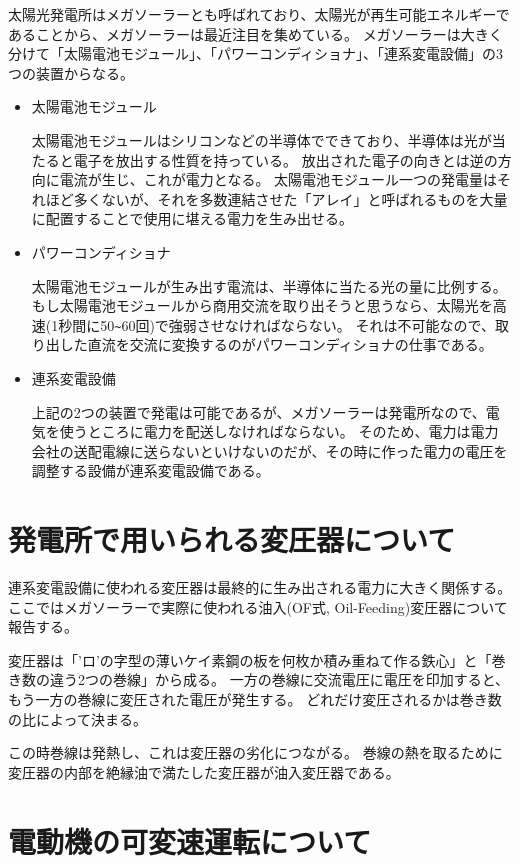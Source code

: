 \documentclass[12pt,titlepage]{ltjsarticle}
\begin{document}
太陽光発電所はメガソーラーとも呼ばれており、太陽光が再生可能エネルギーであることから、メガソーラーは最近注目を集めている。
メガソーラーは大きく分けて「太陽電池モジュール」、「パワーコンディショナ」、「連系変電設備」の3つの装置からなる。
\begin{itemize}
\item 太陽電池モジュール

太陽電池モジュールはシリコンなどの半導体でできており、半導体は光が当たると電子を放出する性質を持っている。
放出された電子の向きとは逆の方向に電流が生じ、これが電力となる。
太陽電池モジュール一つの発電量はそれほど多くないが、それを多数連結させた「アレイ」と呼ばれるものを大量に配置することで使用に堪える電力を生み出せる。

\item パワーコンディショナ

太陽電池モジュールが生み出す電流は、半導体に当たる光の量に比例する。
もし太陽電池モジュールから商用交流を取り出そうと思うなら、太陽光を高速(1秒間に50\verb|~|60回)で強弱させなければならない。
それは不可能なので、取り出した直流を交流に変換するのがパワーコンディショナの仕事である。

\item 連系変電設備

上記の2つの装置で発電は可能であるが、メガソーラーは発電所なので、電気を使うところに電力を配送しなければならない。
そのため、電力は電力会社の送配電線に送らないといけないのだが、その時に作った電力の電圧を調整する設備が連系変電設備である。
\end{itemize}

\section{発電所で用いられる変圧器について}

連系変電設備に使われる変圧器は最終的に生み出される電力に大きく関係する。
ここではメガソーラーで実際に使われる油入(OF式, Oil-Feeding)変圧器について報告する。

変圧器は「'ロ'の字型の薄いケイ素鋼の板を何枚か積み重ねて作る鉄心」と「巻き数の違う2つの巻線」から成る。
一方の巻線に交流電圧に電圧を印加すると、もう一方の巻線に変圧された電圧が発生する。
どれだけ変圧されるかは巻き数の比によって決まる。

この時巻線は発熱し、これは変圧器の劣化につながる。
巻線の熱を取るために変圧器の内部を絶縁油で満たした変圧器が油入変圧器である。

\section{電動機の可変速運転について}
\end{document}
